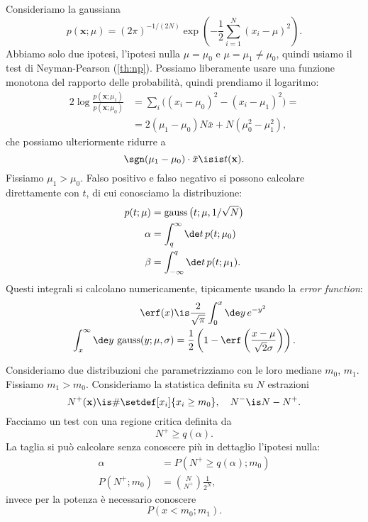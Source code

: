 \begin{solution*}
	Consideriamo la gaussiana
	\begin{equation*}
		p(\mathbf x;\mu)
		= (2\pi)^{-1/(2N)}
		\exp \left( -\frac12 \sum_{i=1}^N (x_i-\mu)^2 \right).
	\end{equation*}
	Abbiamo solo due ipotesi,
	l'ipotesi nulla $\mu=\mu_0$ e $\mu=\mu_1\neq\mu_0$,
	quindi usiamo il test di Neyman-Pearson (\autoref{th:np}).
	Possiamo liberamente usare una funzione monotona del rapporto delle probabilità,
	quindi prendiamo il logaritmo:
	\begin{align*}
		2\log \frac {p(\mathbf x;\mu_1)} {p(\mathbf x;\mu_0)}
		&= \sum_i \big((x_i-\mu_0)^2 - (x_i-\mu_1)^2\big) = \\
		&= 2(\mu_1-\mu_0)N\bar x + N(\mu_0^2-\mu_1^2),
	\end{align*}
	che possiamo ulteriormente ridurre a
	\begin{equation*}
		\sgn(\mu_1-\mu_0)\cdot \bar x
		\isis t(\mathbf x).
	\end{equation*}
	Fissiamo $\mu_1 > \mu_0$.
	Falso positivo e falso negativo si possono calcolare direttamente con $t$,
	di cui conosciamo la distribuzione:
	\begin{align*}
		p(t;\mu)
		&= \operatorname{gauss}\big(t;\mu,1/\sqrt N\big) \\
		\alpha
		&= \int_q^\infty \de t\, p(t;\mu_0) \\
		\beta
		&= \int_{-\infty}^q \de t\, p(t;\mu_1).
	\end{align*}
	Questi integrali si calcolano numericamente,
	tipicamente usando la \emph{error function}:
	\begin{align*}
		\erf(x)
		&\is \frac2{\sqrt\pi} \int_0^x \de y\,e^{-y^2} \\
		\int_x^\infty \de y\, \operatorname{gauss}(y;\mu,\sigma)
		&= \frac12 \left( 1 - \erf\left(\frac{x-\mu}{\sqrt2\sigma}\right) \right).
	\end{align*}
\end{solution*}

\begin{example}
	Consideriamo due distribuzioni che parametrizziamo con le loro mediane $m_0$, $m_1$.
	Fissiamo $m_1>m_0$.
	Consideriamo la statistica definita su $N$ estrazioni
	\begin{equation*}
		N^+(\mathbf x)
		\is \#\setdef[x_i]{x_i\ge m_0},
		\quad N^- \is N - N^+.
	\end{equation*}
	Facciamo un test con una regione critica definita da
	\begin{equation*}
		N^+ \ge q(\alpha).
	\end{equation*}
	La taglia si può calcolare senza conoscere più in dettaglio l'ipotesi nulla:
	\begin{align*}
		\alpha
		&= P(N^+\ge q(\alpha);m_0) \\
		P(N^+;m_0)
		&= \binom N{N^+} \frac1{2^N},
	\end{align*}
	invece per la potenza è necessario conoscere
	\begin{equation*}
		P(x<m_0;m_1).
	\end{equation*}
\end{example}